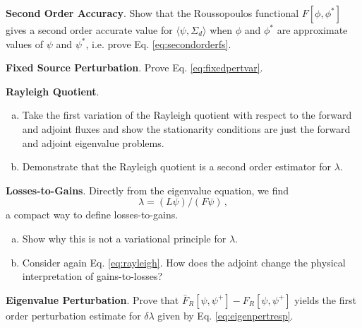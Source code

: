 \begin{exercises}

  \item \textbf{Second Order Accuracy}. 
    Show that the Roussopoulos functional $F[\phi,\phi^*]$ gives a second 
    order accurate value for $\langle \psi,\Sigma_d \rangle$ when $\phi$ 
    and $\phi^*$ are approximate values of $\psi$ and $\psi^*$, i.e. 
    prove Eq. \ref{eq:secondorderfs}.

  \item \textbf{Fixed Source Perturbation}. 
    Prove Eq. \ref{eq:fixedpertvar}.
 
  \item \textbf{Rayleigh Quotient}. 
    \begin{enumerate}[a.]
      \item Take the first variation of the Rayleigh quotient with respect to 
            the forward and adjoint fluxes and show the stationarity conditions 
            are just the forward and adjoint eigenvalue problems. 
      \item Demonstrate that the Rayleigh quotient is a second order 
            estimator for $\lambda$.
    \end{enumerate}

  \item \textbf{Losses-to-Gains}. 
    Directly from the eigenvalue equation, we find 
    \begin{equation*}
      \lambda = (L\psi)/(F\psi) \, ,
    \end{equation*}
    a compact way to define losses-to-gains.  
    \begin{enumerate}[a.]
      \item Show why this is not a variational principle for $\lambda$.
      \item Consider again Eq. \ref{eq:rayleigh}.  How does the adjoint change 
            the physical interpretation of gains-to-losses?
    \end{enumerate}

  \item  \textbf{Eigenvalue Perturbation}. 
    Prove that $\bar{F}_R[\psi,\psi^+]-F_R[\psi,\psi^+]$ yields the first 
    order perturbation estimate for $\delta \lambda$ given 
    by Eq. \ref{eq:eigenpertresp}.


\end{exercises}
